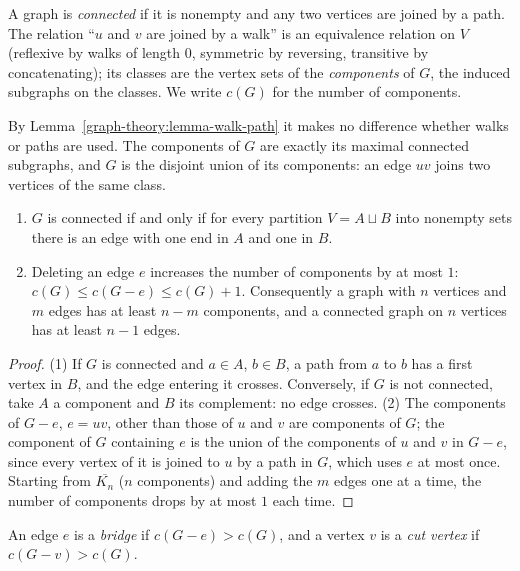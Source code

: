 \begin{definition}\label{graph-theory:definition-connected}
A graph is \emph{connected} if it is nonempty and any two vertices are joined by a path. The relation ``$u$ and $v$ are joined by a walk'' is an equivalence relation on $V$ (reflexive by walks of
length $0$, symmetric by reversing, transitive by concatenating); its classes are the vertex sets of the \emph{components} of $G$, the induced subgraphs on the classes. We write $c(G)$ for the
number of components.
\end{definition}

By Lemma~\ref{graph-theory:lemma-walk-path} it makes no difference whether walks or paths are used. The components of $G$ are exactly its maximal connected subgraphs, and $G$ is the disjoint
union of its components: an edge $uv$ joins two vertices of the same class.

\begin{proposition}\label{graph-theory:proposition-connected-edges}
\begin{enumerate}
\item $G$ is connected if and only if for every partition $V = A \sqcup B$ into nonempty sets there is an edge with one end in $A$ and one in $B$.
\item Deleting an edge $e$ increases the number of components by at most $1$: $c(G) \leq c(G - e) \leq c(G) + 1$. Consequently a graph with $n$ vertices and $m$ edges has at least $n - m$
components, and a connected graph on $n$ vertices has at least $n - 1$ edges.
\end{enumerate}
\end{proposition}

\begin{proof}
(1) If $G$ is connected and $a \in A$, $b \in B$, a path from $a$ to $b$ has a first vertex in $B$, and the edge entering it crosses. Conversely, if $G$ is not connected, take $A$ a component and $B$
its complement: no edge crosses.
(2) The components of $G - e$, $e = uv$, other than those of $u$ and $v$ are components of $G$; the component of $G$ containing $e$ is the union of the components of $u$ and $v$ in $G - e$, since
every vertex of it is joined to $u$ by a path in $G$, which uses $e$ at most once. Starting from $\overline{K_n}$ ($n$ components) and adding the $m$ edges one at a time, the number of components
drops by at most $1$ each time.
\end{proof}

\begin{definition}\label{graph-theory:definition-bridge}
An edge $e$ is a \emph{bridge} if $c(G - e) > c(G)$, and a vertex $v$ is a \emph{cut vertex} if $c(G - v) > c(G)$.
\end{definition}

